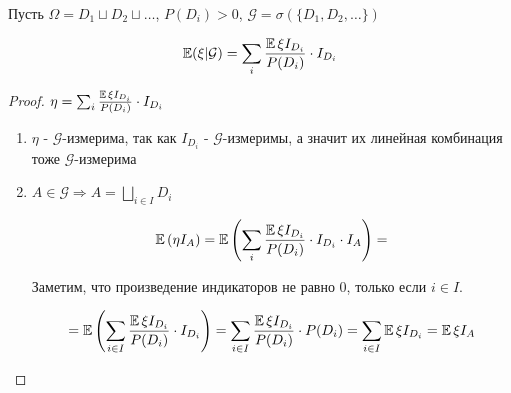 Пусть $\Omega=D_1 \sqcup D_2 \sqcup \ldots$, $P(D_i)>0$, $\mathcal{G}=\sigma(\{D_1, D_2, \ldots\})$

\begin{statement}
    \[ \operatorname{\mathbb{E}}(\xi|\mathcal{G})=\sum_i \frac{\operatorname{\mathbb{E}} \xi I_{D_i}}{P(D_i)} \cdot I_{D_i} \]
\end{statement}

\begin{proof}
    \( \eta = \sum_i \frac{\operatorname{\mathbb{E}} \xi I_{D_i}}{P(D_i)} \cdot I_{D_i} \)
    \begin{enumerate}
        \item $\eta$ - $\mathcal{G}$-измерима, так как $I_{D_i}$ - $\mathcal{G}$-измеримы, а значит их линейная комбинация тоже $\mathcal{G}$-измерима
        
        \item $A \in \mathcal{G} \Rightarrow A = \bigsqcup\limits_{i \in I} D_i$
        
        \[ \operatorname{\mathbb{E}}\left(\eta I_A\right)=\operatorname{\mathbb{E}}\left(\sum_i \frac{\operatorname{\mathbb{E}} \xi I_{D_i}}{P(D_i)} \cdot I_{D_i} \cdot I_A\right)= \]
        
        Заметим, что произведение индикаторов не равно 0, только если $i \in I$.
        
        \[ = \operatorname{\mathbb{E}}\left(\sum_{i \in I} \frac{\operatorname{\mathbb{E}} \xi I_{D_i}}{P(D_i)} \cdot I_{D_i}\right)=\sum_{i \in I} \frac{\operatorname{\mathbb{E}} \xi I_{D_i}}{P(D_i)} \cdot P(D_i)=\sum_{i \in I} \operatorname{\mathbb{E}} \xi I_{D_i}=\operatorname{\mathbb{E}}\xi I_A \]
    \end{enumerate}
\end{proof}